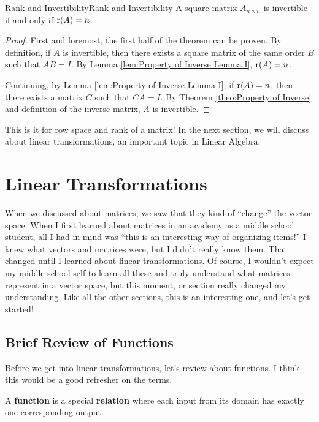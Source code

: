 \documentclass[../main.tex]{subfiles}
\begin{document}
\begin{theorem}{Rank and Invertibility}{Rank and Invertibility}
A square matrix $A_{n \times n}$ is invertible if and only if
$\operatorname{r}(A) = n$.
\end{theorem}
\begin{proof}
First and foremost, the first half of the theorem can be proven.
By definition, if $A$ is invertible, then there exists a square matrix
of the same order $B$ such that $AB = I$. By Lemma \ref{lem:Property
of Inverse Lemma I}, $\operatorname{r}(A) = n$.

Continuing, by Lemma \ref{lem:Property of Inverse Lemma I}, if
$\operatorname{r}(A) = n$, then there exists a matrix $C$ such that $CA = I$.
By Theorem \ref{theo:Property of Inverse} and definition of the
inverse matrix, $A$ is invertible.
\end{proof}

This is it for row space and rank of a matrix! In the next section,
we will discuss about linear transformations, an important topic in
Linear Algebra.

\section{Linear Transformations}

When we discussed about matrices, we saw that they kind of ``change''
the vector space. When I first learned about matrices in an academy
as a middle school student, all I had in mind was ``this is an
interesting way of organizing items!'' I knew what vectors and
matrices were, but I didn't really know them. That changed until
I learned about linear transformations. Of course, I wouldn't expect
my middle school self to learn all these and truly understand what
matrices represent in a vector space, but this moment, or section
really changed my understanding. Like all the other sections, this
is an interesting one, and let's get started!

\subsection{Brief Review of Functions}

Before we get into linear transformations, let's review about
functions. I think this would be a good refresher on the terms.

\begin{definition}
A \textbf{function} is a special \textbf{relation} where each input
from its domain has exactly one corresponding output.
\end{definition}
\end{document}
